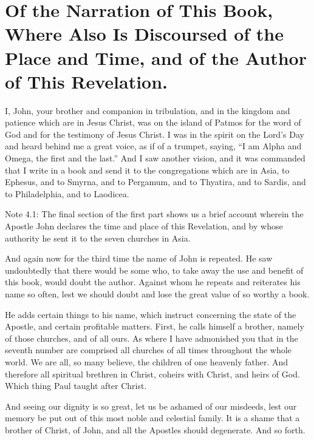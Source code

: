 \chapter[Sermon 4. Of the Narration of This Book, Where Also Is Discoursed of the Place and Time, and of the Author of This Revelation.]{Of the Narration of This Book, Where Also Is Discoursed of the Place and Time, and of the Author of This Revelation.}
\label{sermon:004}

I, John, your brother and companion in tribulation, and in the kingdom and patience which are in Jesus Christ, was on the island of Patmos for the word of God and for the testimony of Jesus Christ. I was in the spirit on the Lord’s Day and heard behind me a great voice, as if of a trumpet, saying, “I am Alpha and Omega, the first and the last.” And I saw another vision, and it was commanded that I write in a book and send it to the congregations which are in Asia, to Ephesus, and to Smyrna, and to Pergamum, and to Thyatira, and to Sardis, and to Philadelphia, and to Laodicea.

Note 4.1: The final section of the first part shows us a brief account wherein the Apostle John declares the time and place of this Revelation, and by whose authority he sent it to the seven churches in Asia.

And again now for the third time the name of John is repeated. He saw undoubtedly that there would be some who, to take away the use and benefit of this book, would doubt the author. Against whom he repeats and reiterates his name so often, lest we should doubt and lose the great value of so worthy a book.

He adds certain things to his name, which instruct concerning the state of the Apostle, and certain profitable matters. First, he calls himself a brother, namely of those churches, and of all ours. As where I have admonished you that in the seventh number are comprised all churches of all times throughout the whole world. We are all, so many believe, the children of one heavenly father. And therefore all spiritual brethren in Christ, coheirs with Christ, and heirs of God. Which thing Paul taught after Christ.

And seeing our dignity is so great, let us be ashamed of our misdeeds, lest our memory be put out of this most noble and celestial family. It is a shame that a brother of Christ, of John, and all the Apostles should degenerate. And so forth.

